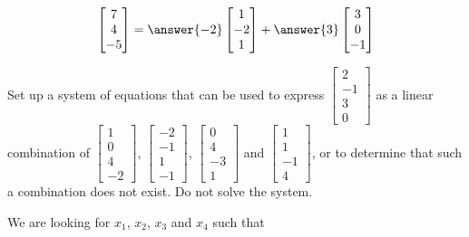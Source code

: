 \documentclass{ximera}
\begin{document}
\begin{example}
\begin{explanation}
$$\begin{bmatrix}7\\4\\-5\end{bmatrix}=\answer{-2}\begin{bmatrix}1\\-2\\1\end{bmatrix}+\answer{3}\begin{bmatrix}3\\0\\-1\end{bmatrix}$$
\end{explanation}
\end{example}

\begin{example}\label{ex:lincombalgebra2}
Set up a system of equations that can be used to express $\begin{bmatrix}2\\-1\\3\\0\end{bmatrix}$ as a linear combination of $\begin{bmatrix}1\\0\\4\\-2\end{bmatrix}$, $\begin{bmatrix}-2\\-1\\1\\-1\end{bmatrix}$, $\begin{bmatrix}0\\4\\-3\\1\end{bmatrix}$ and $\begin{bmatrix}1\\1\\-1\\4\end{bmatrix}$, or to determine that such a combination does not exist.  Do not solve the system.
\begin{explanation}
We are looking for $x_1$, $x_2$, $x_3$ and $x_4$ such that 

\end{explanation}
\end{example}
\end{document}
